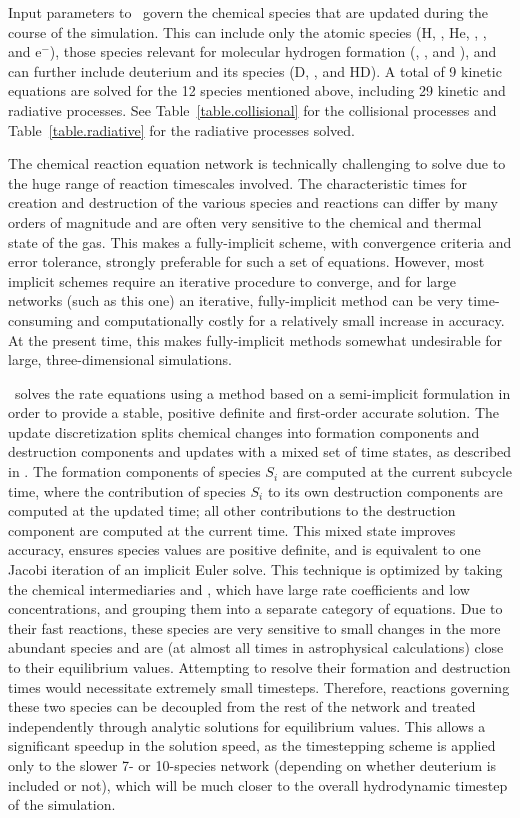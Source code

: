 Input parameters to \enzo\ govern the chemical species that are
updated during the course of the simulation.  This can include only
the atomic species (H, \Hp, He, \Hep, \Hepp, and e$^-$), those species
relevant for molecular hydrogen formation (\HH, \HHp, and \Hm), and
can further include deuterium and its species (D, \Dp, and HD).  A
total of 9 kinetic equations are solved for the 12 species mentioned
above, including 29 kinetic and radiative processes.  See
Table~\ref{table.collisional} for the collisional processes and
Table~\ref{table.radiative} for the radiative processes solved.

The chemical reaction equation network is technically challenging to
solve due to the huge range of reaction timescales involved.  The
characteristic times for creation and destruction of the various
species and reactions can differ by many orders of magnitude and are
often very sensitive to the chemical and thermal state of the gas.
This makes a fully-implicit scheme, with convergence criteria and
error tolerance, strongly preferable for such a set of equations.
However, most implicit schemes require an iterative procedure to
converge, and for large networks (such as this one) an iterative,
fully-implicit method can be very time-consuming and computationally
costly for a relatively small increase in accuracy.  At the present
time, this makes fully-implicit methods somewhat undesirable for
large, three-dimensional simulations.

\enzo\ solves the rate equations using a method based on a
semi-implicit formulation in order to provide a stable, positive
definite and first-order accurate solution.  The update discretization
splits chemical changes into formation components and destruction
components and updates with a mixed set of time states, as described
in \citet{anninos97}.  The formation components of species $S_i$ are
computed at the current subcycle time, where the contribution of
species $S_i$ to its own destruction components are computed at the
updated time; all other contributions to the destruction component are
computed at the current time.  This mixed state improves accuracy,
ensures species values are positive definite, and is equivalent to one
Jacobi iteration of an implicit Euler solve.  This technique is
optimized by taking the chemical intermediaries \Hm and \HHp, which
have large rate coefficients and low concentrations, and grouping them
into a separate category of equations.  Due to their fast reactions,
these species are very sensitive to small changes in the more abundant
species and are (at almost all times in astrophysical calculations)
close to their equilibrium values.  Attempting to resolve their
formation and destruction times would necessitate extremely small
timesteps.  Therefore, reactions governing these two species can be
decoupled from the rest of the network and treated independently
through analytic solutions for equilibrium values.  This allows a
significant speedup in the solution speed, as the timestepping scheme
is applied only to the slower 7- or 10-species network (depending on
whether deuterium is included or not), which will be much closer to
the overall hydrodynamic timestep of the simulation.

